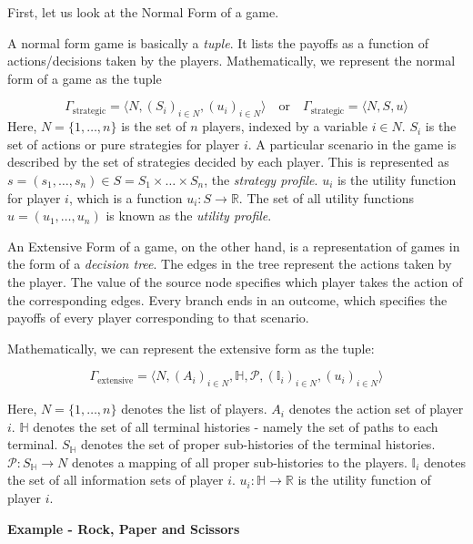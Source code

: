 \documentclass{article}
\theoremstyle{definition}
\begin{document}
First, let us look at the Normal Form of a game. \medskip

A normal form game is basically a \textit{tuple}. It lists the payoffs as a function of actions/decisions taken by the players. Mathematically, we represent the normal form of a game as the tuple 

\[
    \Gamma_{\text{strategic}} = \langle N, (S_i)_{i \in N}, (u_i)_{i \in N} \rangle \quad \text{or} \quad \Gamma_{\text{strategic}} = \langle N, S, u \rangle
\]
Here, $N = \{1, \ldots, n\}$ is the set of $n$ players, indexed by a variable $i \in N$. $S_i$ is the set of actions or pure strategies for player $i$. A particular scenario in the game is described by the set of strategies decided by each player. This is represented as $s = (s_1, \ldots ,s_n) \in S = S_1 \times \ldots \times S_n$, the \textit{strategy profile}. $u_i$ is the utility function for player $i$, which is a function $u_i : S \rightarrow \mathbb{R}$. The set of all utility functions $u = (u_1, \ldots ,u_n)$ is known as the \textit{utility profile}. \medskip

An Extensive Form of a game, on the other hand, is a representation of games in the form of a \textit{decision tree}. The edges in the tree represent the actions taken by the player. The value of the source node specifies which player takes the action of the corresponding edges. Every branch ends in an outcome, which specifies the payoffs of every player corresponding to that scenario. \medskip

Mathematically, we can represent the extensive form as the tuple:

\[
    \Gamma_{\text{extensive}} = \langle N, (A_i)_{i \in N}, \mathbb{H}, \mathcal{P}, (\mathbb{I}_i)_{i \in N}, (u_i)_{i \in N} \rangle    
\]

Here, $N = \{ 1, \ldots , n \}$ denotes the list of players. $A_i$ denotes the action set of player $i$. $\mathbb{H}$ denotes the set of all terminal histories - namely the set of paths to each terminal. $S_\mathbb{H}$ denotes the set of proper sub-histories of the terminal histories. $\mathcal{P} : S_\mathbb{H} \rightarrow N$ denotes a mapping of all proper sub-histories to the players. $\mathbb{I}_i$ denotes the set of all information sets of player $i$. $u_i : \mathbb{H} \rightarrow \mathbb{R}$ is the utility function of player $i$.

\medskip

\textbf{Example - Rock, Paper and Scissors} \medskip
\end{document}
